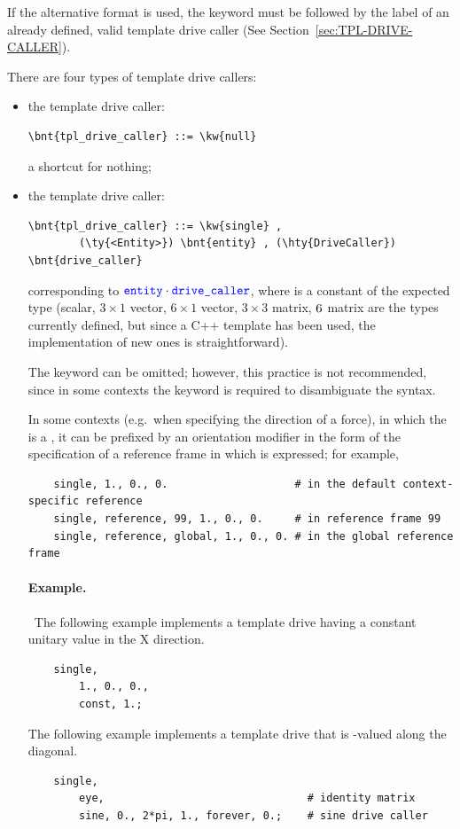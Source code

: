 If the alternative format is used, the keyword  
must be followed by the label of an already defined, valid template drive caller
(See Section~\ref{sec:TPL-DRIVE-CALLER}).

There are four types of template drive callers:
\begin{itemize}
\item the  template drive caller:
\begin{Verbatim}[commandchars=\\\{\}]
    \bnt{tpl_drive_caller} ::= \kw{null}
\end{Verbatim}
a shortcut for nothing;
\item the  template drive caller:
\begin{Verbatim}[commandchars=\\\{\}]
    \bnt{tpl_drive_caller} ::= \kw{single} ,
        (\ty{<Entity>}) \bnt{entity} , (\hty{DriveCaller}) \bnt{drive_caller}
\end{Verbatim}
corresponding to $\textcolor{blue}{\texttt{entity}} \cdot \textcolor{blue}{\texttt{drive\_caller}}$,
where  is a constant of the expected type (scalar, $3 \times 1$ 
vector, $6 \times 1$ vector, $3 \times 3$ matrix, $6 \time 6$ matrix
are the types currently defined, but since 
a C++ template has been used, the implementation of new ones 
is straightforward).

\begin{framed}
The keyword  can be omitted; however, this practice is not recommended,
since in some contexts the keyword is required to disambiguate the syntax.
\end{framed}

In some contexts (e.g.\ when specifying the direction of a force),
in which the  is a , it can be prefixed
by an orientation modifier in the form of the specification
of a reference frame in which  is expressed; for example,
\begin{verbatim}
    single, 1., 0., 0.                    # in the default context-specific reference 
    single, reference, 99, 1., 0., 0.     # in reference frame 99
    single, reference, global, 1., 0., 0. # in the global reference frame
\end{verbatim}

\paragraph{Example.} \
The following example implements a  template drive having a constant unitary value in the X direction.
\begin{verbatim}
    single,
        1., 0., 0.,
        const, 1.;
\end{verbatim}
The following example implements a  template drive that is -valued along the diagonal.
\begin{verbatim}
    single,
        eye,                                # identity matrix
        sine, 0., 2*pi, 1., forever, 0.;    # sine drive caller
\end{verbatim}


\end{itemize}
